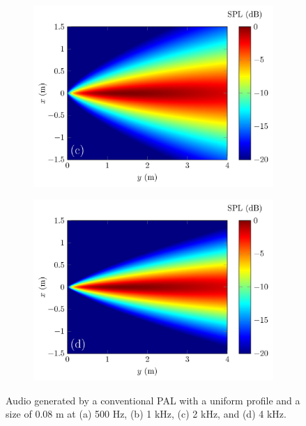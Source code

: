 \begin{figure}[!htb]
\begin{subfigure}{0.45\textwidth}
        \centering
        \includegraphics[width = \textwidth]{fig/Shi2015JasaFig4_Pal2D_PWE_Fullfield_Show_2000Hz_v3_resize.jpg}
    \end{subfigure}
    \begin{subfigure}{0.45\textwidth}
        \centering
        \includegraphics[width = \textwidth]{fig/Shi2015JasaFig4_Pal2D_PWE_Fullfield_Show_4000Hz_v3_resize.jpg}
    \end{subfigure}
    \caption{Audio  generated by a conventional PAL with a uniform profile and a size of 0.08 m at (a) 500 Hz, (b) 1 kHz, (c) 2 kHz, and (d) 4 kHz.}
    \label{fig:cwe_result_2d}
\end{figure}

